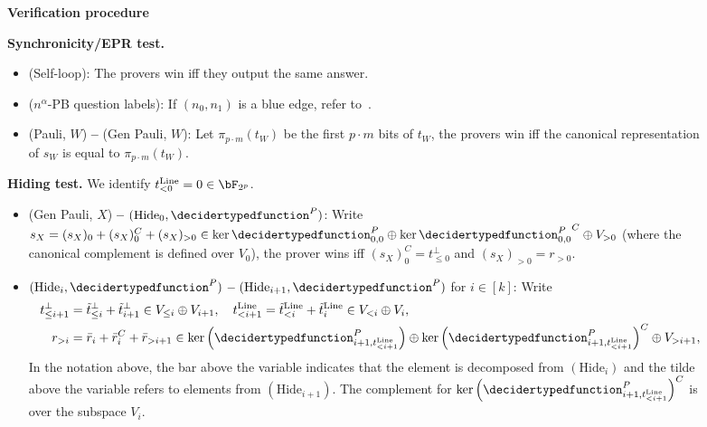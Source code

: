 \begin{figure}[b!]
	\centering
	\footnotesize
	\begin{gamespec}
		\setlength{\tabcolsep}{1em}
		\begin{center}
			\textbf{Verification procedure}
		\end{center}
		\textbf{Synchronicity/EPR test.}
		\begin{itemize}
			\item (Self-loop): The provers win iff they output the same answer. 
			\item ($n^{\alpha}$-PB question labels): If $(n_0, n_1)$ is a blue edge, refer to~. 
			\item (Pauli, $W$) \textbf{--}  (Gen Pauli, $W$): Let $\pi_{p \cdot m}(t_W)$ be the first $p \cdot m$ bits of $t_W$, the provers win iff the canonical representation of $s_W$ is equal to $\pi_{p \cdot m}(t_W)$.
		\end{itemize}
		\textbf{Hiding test. } We identify $t_{< 0}^{\text{Line}} = 0 \in \bF_{2^p}$. 
		\begin{itemize}
			\item (Gen Pauli, $X$) \textbf{--} $(\text{Hide}_0, \decidertypedfunction^{P})$: Write $s_{X} =  (s_{X})_{0} +(s_{X})_{0}^{C} + (s_{X})_{> 0} \in \ker{\decidertypedfunction^{P}_{0,0}} \oplus \ker{\decidertypedfunction^{P}_{0,0}}^{C} \oplus V_{> 0}$ (where the canonical complement is defined over $V_0$), the prover wins iff $(s_{X})_{0}^{C} = t_{\leq 0}^{\bot}$ and $(s_{X})_{> 0} =  r_{> 0}$.  
			\item $(\text{Hide}_{i}, \decidertypedfunction^{P})$ \textbf{--}  $(\text{Hide}_{i+1}, \decidertypedfunction^{P})$ for $i \in [k]$: Write
			\begin{align*}
				t_{\leq i+1 }^{\bot} &= 	\tilde{t}_{\leq i }^{\bot} + \tilde{t}_{ i +1}^{\bot} \in V_{\leq i} \oplus V_{i+1}, \quad t_{< i+1 }^{\text{Line}} = 	\tilde{t}_{< i}^{\text{Line}} + \tilde{t}_{ i}^{\text{Line}} \in V_{< i} \oplus V_{i}, \\
				r_{> i } &= 	\bar{r}_{i} + \bar{r}_{i}^{C} + \bar{r}_{>i+1} \in \ker{\left(\decidertypedfunction^{P}_{i+1,t_{< i +1}^{\text{Line}} }\right)} \oplus  \ker{\left(\decidertypedfunction^{P}_{i+1,t_{< i +1}^{\text{Line}} }\right)}^{C}  \oplus V_{> i+1}, 
			\end{align*}
			In the notation above, the bar above the variable indicates that the element is decomposed from $(\text{Hide}_{i})$ and the tilde above the variable refers to elements from $(\text{Hide}_{i+1})$. The complement for $\ker{\left(\decidertypedfunction^{P}_{i+1,t_{< i +1}^{\text{Line}} }\right)}^{C}$ is over the subspace $V_i$.
			

\end{itemize}
\end{gamespec}
\end{figure}
